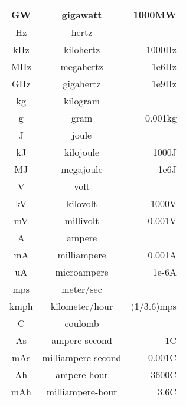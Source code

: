 \begin{longtable}{|c|c|r|}
  GW & gigawatt & 1000MW \\\hline
  Hz & hertz & \\\hline
  kHz & kilohertz & 1000Hz \\\hline
  MHz & megahertz & 1e6Hz \\\hline
  GHz & gigahertz & 1e9Hz \\\hline
  kg & kilogram & \\\hline
  g & gram & 0.001kg \\\hline
  J & joule & \\\hline
  kJ & kilojoule & 1000J \\\hline
  MJ & megajoule & 1e6J \\\hline
  V & volt & \\\hline
  kV & kilovolt & 1000V \\\hline
  mV & millivolt & 0.001V \\\hline
  A & ampere & \\\hline
  mA & milliampere & 0.001A \\\hline
  uA & microampere & 1e-6A \\\hline
  mps & meter/sec & \\\hline
  kmph & kilometer/hour & (1/3.6)mps \\\hline
  C & coulomb & \\\hline
  As & ampere-second & 1C \\\hline
  mAs & milliampere-second & 0.001C \\\hline
  Ah & ampere-hour & 3600C \\\hline
  mAh & milliampere-hour & 3.6C \\\hline
\end{longtable}



